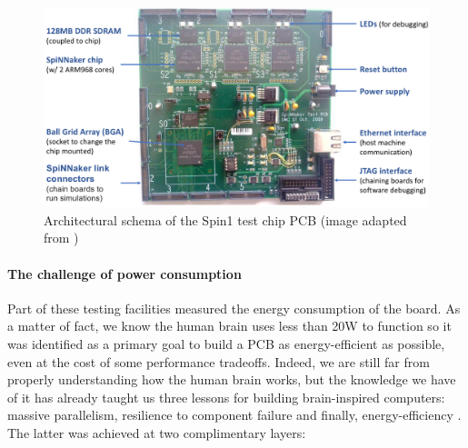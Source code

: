 \begin{figure}[!ht]
\centering
\includegraphics[width=\textwidth]{figures/spin1-schema.png}
\caption{Architectural schema of the Spin1 test chip PCB (image adapted from \cite{dev-process})}
\label{fig:spin1}
\end{figure} 


\paragraph{The challenge of power consumption}

Part of these testing facilities measured the energy consumption of the board. As a matter of fact, we know the human brain uses less than 20W to function so it was identified as a primary goal to build a PCB as energy-efficient as possible, even at the cost of some performance tradeoffs. Indeed, we are still far from properly understanding how the human brain works, but the knowledge we have of it has already taught us three lessons for building brain-inspired computers: massive parallelism, resilience to component failure and finally, energy-efficiency \citep{bic}. The latter was achieved at two complimentary layers:

